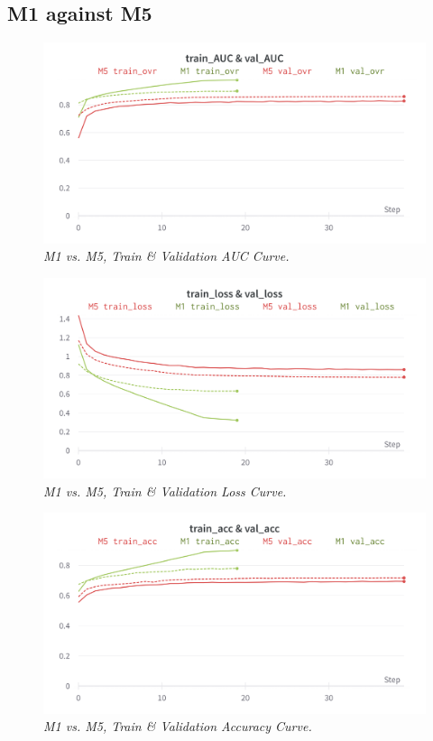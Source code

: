 \newpage


\subsection{M1 against M5}

\begin{figure}[H]
  \centering
  \includegraphics[width=\textwidth]{imatges/results/AUCM1M5.png}
  \caption[M1 vs. M5, Train \& Validation AUC Curve]{\textit{M1 vs. M5, Train \& Validation AUC Curve. }}
\end{figure}


\begin{figure}[H]
  \centering
  \includegraphics[width=\textwidth]{imatges/results/LossM1M5.png}
  \caption[M1 vs. M5, Train \& Validation Loss Curve]{\textit{M1 vs. M5, Train \& Validation Loss Curve. }}
\end{figure}

\newpage

\begin{figure}[H]
  \centering
  \includegraphics[width=\textwidth]{imatges/results/AccM1M5.png}
  \caption[M1 vs. M5, Train \& Validation Accuracy Curve]{\textit{M1 vs. M5, Train \& Validation Accuracy Curve. }}
\end{figure}


